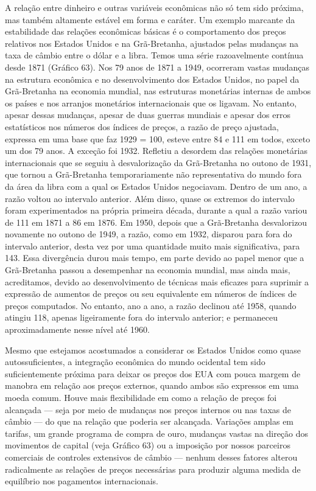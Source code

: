 \documentclass[a4paper,12pt]{article}[abntex2]
\begin{document}
A relação entre dinheiro e outras variáveis econômicas não só tem sido próxima, mas também altamente estável em forma e caráter. Um exemplo marcante da estabilidade das relações econômicas básicas é o comportamento dos preços relativos nos Estados Unidos e na Grã-Bretanha, ajustados pelas mudanças na taxa de câmbio entre o dólar e a libra. Temos uma série razoavelmente contínua desde 1871 (Gráfico 63). Nos 79 anos de 1871 a 1949, ocorreram vastas mudanças na estrutura econômica e no desenvolvimento dos Estados Unidos, no papel da Grã-Bretanha na economia mundial, nas estruturas monetárias internas de ambos os países e nos arranjos monetários internacionais que os ligavam. No entanto, apesar dessas mudanças, apesar de duas guerras mundiais e apesar dos erros estatísticos nos números dos índices de preços, a razão de preço ajustada, expressa em uma base que faz 1929 = 100, esteve entre 84 e 111 em todos, exceto um dos 79 anos. A exceção foi 1932. Refletiu a desordem das relações monetárias internacionais que se seguiu à desvalorização da Grã-Bretanha no outono de 1931, que tornou a Grã-Bretanha temporariamente não representativa do mundo fora da área da libra com a qual os Estados Unidos negociavam. Dentro de um ano, a razão voltou ao intervalo anterior. Além disso, quase os extremos do intervalo foram experimentados na própria primeira década, durante a qual a razão variou de 111 em 1871 a 86 em 1876. Em 1950, depois que a Grã-Bretanha desvalorizou novamente no outono de 1949, a razão, como em 1932, disparou para fora do intervalo anterior, desta vez por uma quantidade muito mais significativa, para 143. Essa divergência durou mais tempo, em parte devido ao papel menor que a Grã-Bretanha passou a desempenhar na economia mundial, mas ainda mais, acreditamos, devido ao desenvolvimento de técnicas mais eficazes para suprimir a expressão de aumentos de preços ou seu equivalente em números de índices de preços computados. No entanto, ano a ano, a razão declinou até 1958, quando atingiu 118, apenas ligeiramente fora do intervalo anterior; e permaneceu aproximadamente nesse nível até 1960.

Mesmo que estejamos acostumados a considerar os Estados Unidos como quase autossuficientes, a integração econômica do mundo ocidental tem sido suficientemente próxima para deixar os preços dos EUA com pouca margem de manobra em relação aos preços externos, quando ambos são expressos em uma moeda comum. Houve mais flexibilidade em como a relação de preços foi alcançada — seja por meio de mudanças nos preços internos ou nas taxas de câmbio — do que na relação que poderia ser alcançada. Variações amplas em tarifas, um grande programa de compra de ouro, mudanças vastas na direção dos movimentos de capital (veja Gráfico 63) ou a imposição por nossos parceiros comerciais de controles extensivos de câmbio — nenhum desses fatores alterou radicalmente as relações de preços necessárias para produzir alguma medida de equilíbrio nos pagamentos internacionais.
\end{document}

